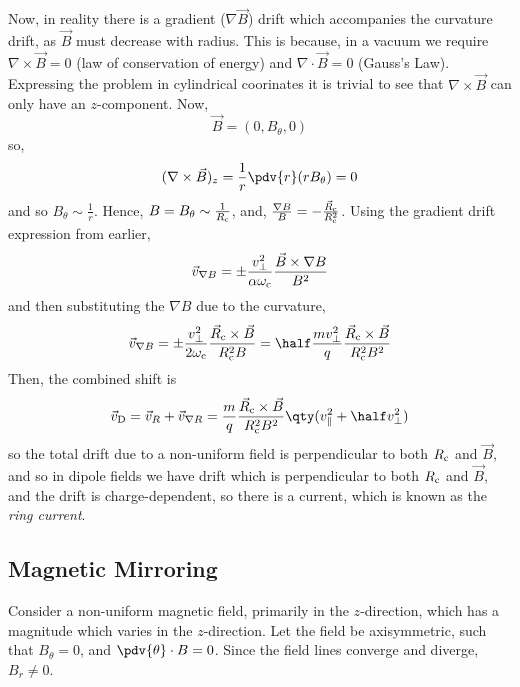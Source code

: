 \documentclass{book}         		                %
\begin{document}
Now, in reality there is a gradient ($\nabla \vec{B}$) drift which
accompanies the curvature drift, as $\vec{B}$ must decrease with
radius. This is because, in a vacuum we require $\nabla \times \vec{B}
= 0$ (law of conservation of energy) and $\nabla \cdot \vec{B} = 0$
(Gauss's Law). Expressing the problem in cylindrical coorinates it is
trivial to see that $\nabla \times \vec{B}$ can only have an
$z$-component. Now,
\[ \vec{B} = (0, B_{\theta}, 0)\]
so,
\[ ( \nabla \times \vec{B} )_z = \frac{1}{r} \pdv{r} (r B_{\theta}) =
0 \] and so $B_{\theta}\sim\frac{1}{r}$.  Hence, $B = B_{\theta} \sim
\frac{1}{R_{\rm c}}$, and, $\frac{\nabla B}{B} = - \frac{\vec{R}_{\rm
    c}}{R_{\rm c}^2}$. Using the gradient drift expression from earlier, 
\begin{equation}
  \label{eq:2}
  \vec{v}_{\nabla B} = \pm \frac{v_{\perp}^2}{\alpha \omega_{\rm c}} \frac{\vec{B} \times \nabla B}{B^2}
\end{equation}
and then substituting the $\nabla B$ due to the curvature, 
\begin{equation}
  \label{eq:3}
  \vec{v}_{\nabla B} = \pm \frac{v_{\perp}^2}{2 \omega_{\rm c}} \frac{\vec{R}_{\rm c} \times \vec{B}}{R_{\rm c}^2 B} = \half \frac{m v_{\perp}^2}{q} \frac{\vec{R}_{\rm c} \times \vec{B}}{R_{\rm c}^2 B^2}
\end{equation}
Then, the combined shift is
\begin{equation}
  \label{eq:4}
  \vec{v}_{\rm D} = \vec{v}_{R} + \vec{v}_{\nabla R} = \frac{m}{q} \frac{\vec{R}_{\rm c} \times \vec{B}}{R_{\rm c}^2 B^2} \qty( v_{\parallel}^2 + \half v_{\perp}^2 )
\end{equation}
so the total drift due to a non-uniform field is perpendicular to both
$R_{\rm c}$ and $\vec{B}$, and so in dipole fields we have drift which
is perpendicular to both $R_{\rm c}$ and $\vec{B}$, and the drift is
charge-dependent, so there is a current, which is known as the
\emph{ring current}.

\subsection{Magnetic Mirroring}
\label{sec:magnetic-mirroring}

Consider a non-uniform magnetic field, primarily in the $z$-direction,
which has a magnitude which varies in the $z$-direction. Let the field
be axisymmetric, such that $B_{\theta}=0$, and $\pdv{\theta}\cdot
B=0$. Since the field lines converge and diverge, $B_r \neq 0$.
\end{document}
